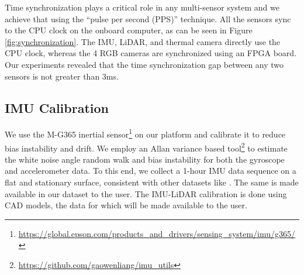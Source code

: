 \documentclass[10pt,twocolumn,letterpaper]{article}
\begin{document}
Time synchronization plays a critical role in any multi-sensor system and we achieve that using the ``pulse per second (PPS)'' technique. All the sensors sync to the CPU clock on the onboard computer, as can be seen in Figure \ref{fig:synchronization}. The IMU, LiDAR, and thermal camera directly use the CPU clock, whereas the 4 RGB cameras are synchronized using an FPGA board. Our experiments revealed that the time synchronization gap between any two sensors is not greater than 3ms.




\subsection{IMU Calibration}


We use the M-G365 inertial sensor\footnote{\href{https://global.epson.com/products\_and\_drivers/sensing\_system/imu/g365/}{https://global.epson.com/products\_and\_drivers/sensing\_system/imu/g365/}} on our platform and calibrate it to reduce bias instability and drift. We employ an Allan variance\cite{4404126} based tool\footnote{\href{https://github.com/gaowenliang/imu\_utils}{https://github.com/gaowenliang/imu\_utils}}
to estimate the white noise angle random walk and bias instability for both the gyroscope and accelerometer data.
To this end, we collect a 1-hour IMU data sequence on a flat and stationary surface, consistent with other datasets like \cite{zhang2021multi}. The same is made available in our dataset to the user. The IMU-LiDAR calibration is done using CAD models, the data for which will be made available to the user.
\end{document}
